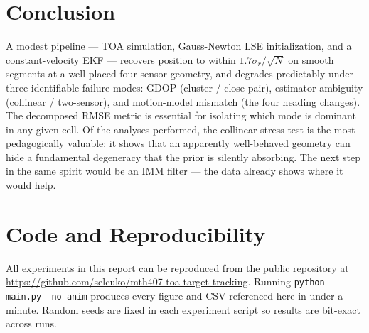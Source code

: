 \documentclass[11pt,a4paper]{article}
\begin{document}
\section{Conclusion}

A modest pipeline --- TOA simulation, Gauss-Newton LSE initialization, and
a constant-velocity EKF --- recovers position to within $1.7\sigma_r/\sqrt{N}$
on smooth segments at a well-placed four-sensor geometry, and degrades
predictably under three identifiable failure modes: GDOP (cluster /
close-pair), estimator ambiguity (collinear / two-sensor), and motion-model
mismatch (the four heading changes).  The decomposed RMSE metric is essential
for isolating which mode is dominant in any given cell.  Of the analyses
performed, the collinear stress test is the most pedagogically valuable: it
shows that an apparently well-behaved geometry can hide a fundamental
degeneracy that the prior is silently absorbing.  The next step in the same
spirit would be an IMM filter --- the data already shows where it would help.

\section*{Code and Reproducibility}

All experiments in this report can be reproduced from the public
repository at
\url{https://github.com/selcuko/mth407-toa-target-tracking}.
Running \texttt{python main.py --no-anim} produces every figure and CSV
referenced here in under a minute.  Random seeds are fixed in each
experiment script so results are bit-exact across runs.
\end{document}
